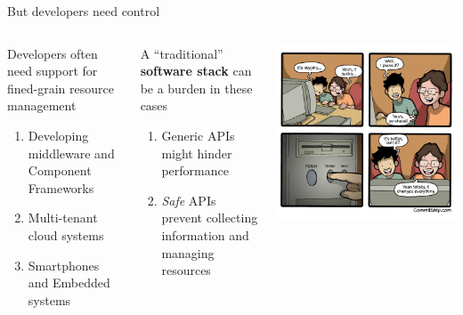 \documentclass[10pt,xcolor={dvipsnames}]{beamer}
\begin{document}
	\begin{frame}{But developers need control}
		\begin{footnotesize}
		\vspace{-.2cm}
		\begin{columns}
			\begin{exampleblock} {Developers often need support for fined-grain resource management}
				
					\begin{enumerate}[1]
						\item Developing middleware and Component Frameworks
						\item Multi-tenant cloud systems
						\item Smartphones and Embedded systems
					\end{enumerate}
			\end{exampleblock}
			\vspace{-.2cm}
			\begin{block} {A ``traditional'' \textbf{software stack} can be a burden in these cases}
				\begin{footnotesize}
					\begin{enumerate}[1]
						\item Generic APIs might hinder performance
						\item \textit{Safe} APIs prevent collecting information and managing resources
					\end{enumerate}
				\end{footnotesize}
			\end{block}
			\includegraphics[scale=0.29]{fig/need-for-speed.jpg}

\end{columns}
\end{footnotesize}
\end{frame}
\end{document}
